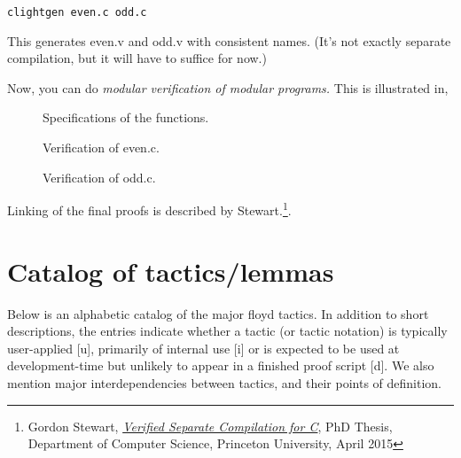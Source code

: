 \documentclass[12pt,fleqn,openany,oneside,showtrims]{memoir}
\begin{document}
\noindent\texttt{clightgen even.c odd.c}

This generates even.v and odd.v with consistent names.  (It's not
exactly separate compilation, but it will have to suffice for now.)

Now, you can do \emph{modular verification of modular programs.}  This is
illustrated in,

\begin{description}
\item[]  Specifications of the functions.
\item[] Verification of even.c.
\item[] Verification of odd.c.
\end{description}
Linking of the final proofs is described by Stewart.\footnote{Gordon Stewart,
  \emph{\href{http://www.cs.princeton.edu/research/techreps/TR-980-15}{Verified Separate Compilation for C}}, PhD Thesis, Department of Computer Science, Princeton University, April 2015}.

\chapter{Catalog of tactics/lemmas}
Below is an alphabetic catalog of the major floyd tactics. In addition
to short descriptions, the entries indicate whether a tactic (or
tactic notation) is typically user-applied [u], primarily of
internal use [i] or is expected to be used at development-time
but unlikely to appear in a finished proof script [d]. We also
mention major interdependencies between tactics, and their points of
definition.
\end{document}
